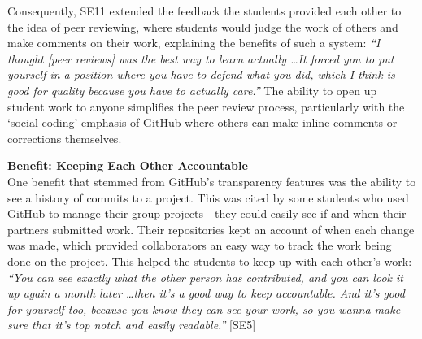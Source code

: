 Consequently, SE11 extended the feedback the students provided each other to the idea of peer reviewing, where students would judge the work of others and make comments on their work, explaining the benefits of such a system: \textit{``I thought [peer reviews] was the best way to learn actually \ldots It forced you to put yourself in a position where you have to defend what you did, which I think is good for quality because you have to actually care.''} The ability to open up student work to anyone simplifies the peer review process, particularly with the `social coding' emphasis of GitHub where others can make inline comments or corrections themselves.


\textbf{Benefit: Keeping Each Other Accountable} \\
One benefit that stemmed from GitHub's transparency features was the ability to see a history of commits to a project. This was cited by some students who used GitHub to manage their group projects---they could easily see if and when their partners submitted work. Their repositories kept an account of when each change was made, which provided collaborators an easy way to track the work being done on the project. This helped the students to keep up with each other's work: \textit{``You can see exactly what the other person has contributed, and you can look it up again a month later \ldots then it's a good way to keep accountable. And it's good for yourself too, because you know they can see your work, so you wanna make sure that it's top notch and easily readable.''} [SE5]


